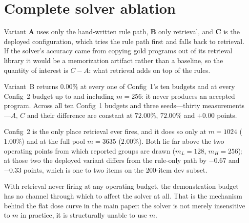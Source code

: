 \section{Complete solver ablation}
\label{app:solver}

Variant \textbf{A} uses only the hand-written rule path, \textbf{B} only
retrieval, and \textbf{C} is the deployed configuration, which tries the rule
path first and falls back to retrieval. If the solver's accuracy came from
copying gold programs out of its retrieval library it would be a memorization
artifact rather than a baseline, so the quantity of interest is $C-A$: what
retrieval adds on top of the rules.



\noindent
Variant~B returns $0.00\%$ at every one of Config~1's ten budgets and at every
Config~2 budget up to and including $m{=}256$: it never produces an accepted
program. Across all ten Config~1 budgets and three seeds---thirty
measurements---$A$, $C$ and their difference are constant at $72.00\%$,
$72.00\%$ and $+0.00$ points.

Config~2 is the only place retrieval ever fires, and it does so only at
$m{=}1024$ ($1.00\%$) and at the full pool $m{=}3635$ ($2.00\%$). Both lie far
above the two operating points from which reported groups are drawn
($m_L{=}128$, $m_H{=}256$); at those two the deployed variant differs from the
rule-only path by $-0.67$ and $-0.33$ points, which is one to two items on the
200-item dev subset.

With retrieval never firing at any operating budget, the demonstration budget
has no channel through which to affect the solver at all. That is the mechanism
behind the flat dose curve in the main paper: the solver is not merely
insensitive to $m$ in practice, it is structurally unable to use $m$.
